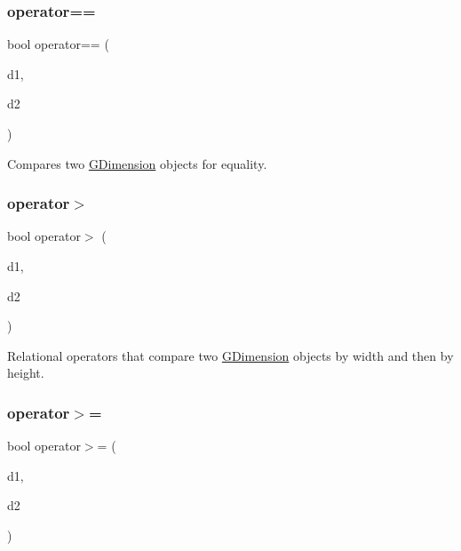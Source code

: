 \subsubsection{\texorpdfstring{operator==}{operator==}}
{\footnotesize\ttfamily bool operator== (\begin{DoxyParamCaption}\item[{const \mbox{\hyperlink{structsgl_1_1GDimension}{G\+Dimension}} \&}]{d1,  }\item[{const \mbox{\hyperlink{structsgl_1_1GDimension}{G\+Dimension}} \&}]{d2 }\end{DoxyParamCaption})\hspace{0.3cm}{\ttfamily [friend]}}



Compares two \mbox{\hyperlink{structsgl_1_1GDimension}{G\+Dimension}} objects for equality. 

\mbox{\label{structsgl_1_1GDimension_a9a2ff65ec3535534d2087f7a29ddf1e8}} 
\subsubsection{\texorpdfstring{operator$>$}{operator>}}
{\footnotesize\ttfamily bool operator$>$ (\begin{DoxyParamCaption}\item[{const \mbox{\hyperlink{structsgl_1_1GDimension}{G\+Dimension}} \&}]{d1,  }\item[{const \mbox{\hyperlink{structsgl_1_1GDimension}{G\+Dimension}} \&}]{d2 }\end{DoxyParamCaption})\hspace{0.3cm}{\ttfamily [friend]}}



Relational operators that compare two \mbox{\hyperlink{structsgl_1_1GDimension}{G\+Dimension}} objects by width and then by height. 

\mbox{\label{structsgl_1_1GDimension_a52915605adf1b94cbc876aa6b819b70d}} 
\subsubsection{\texorpdfstring{operator$>$=}{operator>=}}
{\footnotesize\ttfamily bool operator$>$= (\begin{DoxyParamCaption}\item[{const \mbox{\hyperlink{structsgl_1_1GDimension}{G\+Dimension}} \&}]{d1,  }\item[{const \mbox{\hyperlink{structsgl_1_1GDimension}{G\+Dimension}} \&}]{d2 }\end{DoxyParamCaption})\hspace{0.3cm}{\ttfamily [friend]}}



